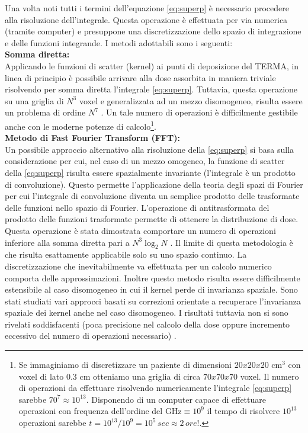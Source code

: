 {Una volta noti tutti i termini dell'equazione \eqref{eq:superp} è necessario procedere alla risoluzione dell'integrale. Questa operazione è effettuata per via numerica (tramite computer) e presuppone una discretizzazione dello spazio di integrazione e delle funzioni integrande. I metodi adottabili sono i seguenti:\\

\textbf{Somma diretta:\\}
Applicando le funzioni di scatter (kernel) ai punti di deposizione del TERMA, in linea di principio è possibile arrivare alla dose assorbita in maniera triviale risolvendo per somma diretta l'integrale \eqref{eq:superp}. Tuttavia, questa operazione su una griglia di $N^3$ voxel e generalizzata ad un mezzo disomogeneo, risulta essere un problema  di ordine $N^7$ \cite{Ahnesjo1989}. Un tale numero di operazioni è difficilmente gestibile anche con le moderne potenze di calcolo\footnote{Se immaginiamo di discretizzare un paziente di dimensioni $20x20x20$ cm$^3$ con voxel di lato $0.3$ cm otteniamo una griglia di circa $70x70x70$ voxel. Il numero di operazioni da effettuare risolvendo numericamente l'integrale \eqref{eq:superp} sarebbe $70^7\approx 10^{13}$. Disponendo di un computer capace di effettuare operazioni con frequenza dell'ordine del GHz$\equiv 10^9$ il tempo di risolvere $10^{13}$ operazioni sarebbe $t=10^{13}/10^9=10^5\,sec\approx 2\, ore!$.}. \\

\textbf{Metodo di Fast Fourier Transform (FFT):\\}
Un possibile approccio alternativo alla risoluzione della \eqref{eq:superp} si basa sulla considerazione per cui, nel caso di un mezzo omogeneo, la funzione di scatter della \eqref{eq:superp} risulta essere spazialmente invariante (l'integrale è un prodotto di convoluzione). Questo permette l'applicazione della teoria degli spazi di Fourier per cui l'integrale di convoluzione  diventa un semplice prodotto delle trasformate delle funzioni nello spazio di Fourier. L'operazione di antitrasformata del prodotto delle funzioni trasformate permette di ottenere la distribuzione di dose. Questa operazione è stata dimostrata comportare un numero di operazioni inferiore alla somma diretta pari a $N^3\log_2 N$ \cite{Wong1996}. Il limite di questa metodologia è che risulta esattamente applicabile solo su uno spazio continuo. La discretizzazione che inevitabilmente va effettuata per un calcolo numerico comporta delle approssimazioni. Inoltre questo metodo risulta essere difficilmente estensibile al caso disomogeneo in cui il kernel perde di invarianza spaziale. Sono stati studiati vari approcci basati su correzioni orientate a recuperare l'invarianza spaziale dei kernel anche nel caso disomogeneo. I risultati tuttavia non si sono rivelati soddisfacenti (poca precisione nel calcolo della dose oppure incremento eccessivo del numero di operazioni necessario) \cite{Wong1996}.\\

}
